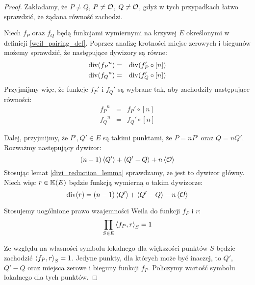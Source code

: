 \begin{proof}
Zakładamy, że $P \neq Q$, $P \neq \mathcal{O}$, $Q \neq \mathcal{O}$,
gdyż w tych przypadkach łatwo sprawdzić, że żądana równość zachodzi.

\noindent
Niech $f_P$ oraz $f_Q$ będą funkcjami wymiernymi na krzywej $E$
określonymi w definicji \ref{weil_pairing_def}.
Poprzez analizę krotności miejsc zerowych i biegunów możemy sprawdzić,
że następujące dywizory są równe:
\begin{eqnarray*}
\operatorname{div}({f_P}^n) & = & \operatorname{div}(f_P' \circ [n]) \\
\operatorname{div}({f_Q}^n) & = & \operatorname{div}(f_Q' \circ [n])
\end{eqnarray*}
Przyjmijmy więc, że funkcje $f_P'$ i $f_Q'$ są wybrane tak,
aby zachodziły następujące równości:
\begin{eqnarray*}
{f_P}^n & = & f_P' \circ [n] \\
{f_Q}^n & = & f_Q' \circ [n]
\end{eqnarray*}

\noindent
Dalej, przyjmijmy, że $P', Q' \in E$ są takimi punktami,
że $P = nP'$ oraz $Q = nQ'$.
Rozważmy następujący dywizor:
\begin{equation*}
(n-1)\left\langle Q'\right\rangle + \left\langle Q' - Q\right\rangle + n\left\langle\mathcal{O}\right\rangle
\end{equation*}
Stosując lemat \ref{divi_reduction_lemma} sprawdzamy,
że jest to dywizor główny.
Niech więc $r \in \mathbb{K}(E)$ będzie funkcją wymierną o takim dywizorze:
\begin{equation*}
\operatorname{div}(r) = (n-1)\left\langle Q'\right\rangle + \left\langle Q' - Q\right\rangle - n\left\langle\mathcal{O}\right\rangle
\end{equation*}

\noindent
Stosujemy uogólnione prawo wzajemności Weila do funkcji $f_P$ i $r$:
\begin{equation}\label{weil_reci_fp_r}
\prod_{S \in E} \left\langle f_P , r \right\rangle_{S} = 1
\end{equation}

\noindent
Ze względu na własności symbolu lokalnego dla większości punktów $S$
będzie zachodzić $\left\langle f_P , r \right\rangle_{S} = 1$.
Jedyne punkty, dla których może być inaczej,
to $Q'$, $Q' - Q$ oraz miejsca zerowe i bieguny funkcji $f_P$.
Policzymy wartość symbolu lokalnego dla tych punktów.


\end{proof}
